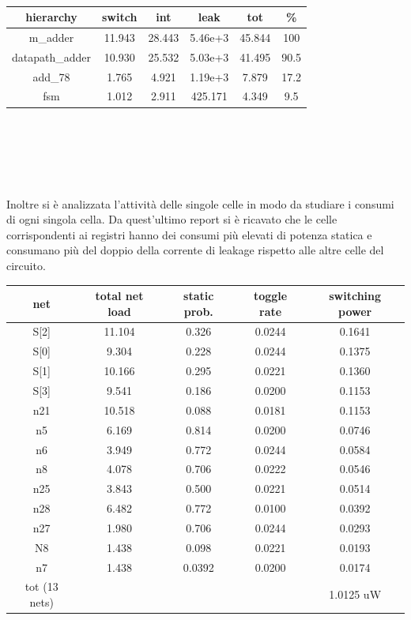 \\
\begin{table}[!h]\footnotesize
	\centering
	\begin{tabular}{|c|c|c|c|c|c|}
		\hline
		\textbf{hierarchy} & \textbf{switch} & \textbf{int} & \textbf{leak}& \textbf{tot}& \textbf{\%}\\
		\hline
		m\_adder & 11.943 & 28.443 & 5.46e+3 & 45.844 & 100\\
		\hline
		datapath\_adder & 10.930 & 25.532 & 5.03e+3 & 41.495 & 90.5\\
		\hline
		add\_78 & 1.765 & 4.921  & 1.19e+3 & 7.879 & 17.2\\
		\hline
		fsm & 1.012 & 2.911 & 425.171 & 4.349 & 9.5\\
		\hline
	\end{tabular}
\end{table} \\
\\
\\
\\
\\
Inoltre si è  analizzata l’attività delle singole celle in modo da studiare i consumi di ogni singola cella. Da quest’ultimo report si è ricavato che le celle corrispondenti ai registri hanno dei consumi più elevati di potenza statica e consumano più del doppio della corrente di leakage rispetto alle altre celle del circuito.
\begin{table}[!h]\footnotesize
	\centering
	\begin{tabular}{|c|c|c|c|c|}
		\hline
		\textbf{net} & \textbf{total net load} & \textbf{static prob.} & \textbf{toggle rate}& \textbf{switching power}\\
		\hline
		S[2] & 11.104 & 0.326 & 0.0244 & 0.1641\\
		\hline
		S[0] & 9.304 & 0.228 & 0.0244 & 0.1375\\
		\hline
		S[1] & 10.166 & 0.295 & 0.0221 & 0.1360\\
		\hline
		S[3] & 9.541 & 0.186 & 0.0200 & 0.1153\\
		\hline
		n21 & 10.518 & 0.088 & 0.0181 & 0.1153\\
		\hline
		n5 & 6.169 & 0.814 & 0.0200 & 0.0746\\
		\hline
		n6 & 3.949 & 0.772 & 0.0244 & 0.0584\\
		\hline
		n8 & 4.078 & 0.706 & 0.0222 & 0.0546\\
		\hline
		n25 & 3.843 & 0.500 & 0.0221 & 0.0514\\
		\hline
		n28 & 6.482 & 0.772 & 0.0100 & 0.0392\\
		\hline
		n27 & 1.980 & 0.706 & 0.0244 & 0.0293\\
		\hline
		N8 & 1.438 & 0.098 & 0.0221 & 0.0193\\
		\hline
		n7 & 1.438 & 0.0392 & 0.0200 & 0.0174\\
		\hline
		\hline
		tot (13 nets) &  &  &  & 1.0125 uW\\
		\hline 
	\end{tabular}
\end{table} \\
